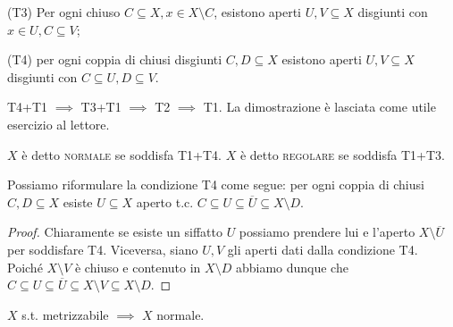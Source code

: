 (T3) Per ogni chiuso $C \subseteq X, x \in X \setminus C$, esistono aperti $U, V \subseteq X$ disgiunti con $x \in U, C \subseteq V$;

(T4) per ogni coppia di chiusi disgiunti $C, D \subseteq X$ esistono aperti $U, V \subseteq X$ disgiunti con $C \subseteq U, D \subseteq V$.

\begin{oss}
  T4+T1 $\implies$ T3+T1 $\implies$ T2 $\implies$ T1. La dimostrazione è lasciata come utile esercizio al lettore.
\end{oss}

\begin{defn}
  $X$ è detto \textsc{normale} se soddisfa T1+T4. $X$ è detto \textsc{regolare} se soddisfa T1+T3.
\end{defn}

\begin{oss}
  Possiamo riformulare la condizione T4 come segue: per ogni coppia di chiusi $C, D \subseteq X$ esiste $U \subseteq X$ aperto t.c. $C \subseteq U \subseteq \overline{U} \subseteq X \setminus D$.
\end{oss}

\begin{proof}
  Chiaramente se esiste un siffatto $U$ possiamo prendere lui e l'aperto $X \setminus \overline{U}$ per soddisfare T4. Viceversa, siano $U, V$ gli aperti dati dalla condizione T4. Poiché $X \setminus V$ è chiuso e contenuto in $X \setminus D$ abbiamo dunque che $C \subseteq U \subseteq \overline{U} \subseteq X \setminus V \subseteq X \setminus D$.
\end{proof}

\begin{prop}
  $X$ s.t. metrizzabile $\implies$ $X$ normale.
\end{prop}

